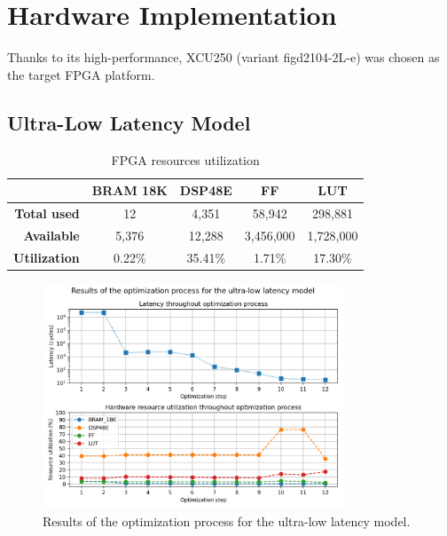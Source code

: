 \section{Hardware Implementation}
Thanks to its high-performance, XCU250 (variant figd2104-2L-e) was chosen as the target FPGA platform.

\subsection{Ultra-Low Latency Model}
\indo{|}
\indo{|}
\indo{|}

\indo{|}
\indo{|}

\begin{table}[hpt!]
  \centering
  \caption{FPGA resources utilization}
  \label{tab:utilization}
  \bgroup
  \def\arraystretch{1.3}
  \setlength\tabcolsep{3mm}
  \begin{tabular}{r|c|c|c|c|}
  \cline{2-5}
  \multicolumn{1}{c|}{}                      & \textbf{BRAM 18K} & \textbf{DSP48E} & \textbf{FF} & \textbf{LUT} \\ \hline
  \multicolumn{1}{|r|}{\textbf{Total used}}       & 12                 & 4,351            & 58,942       & 298,881       \\ \hline
  \multicolumn{1}{|r|}{\textbf{Available}}   & 5,376              & 12,288           & 3,456,000     & 1,728,000      \\ \hline\hline
  \multicolumn{1}{|r|}{\textbf{Utilization}} & 0.22\%            & 35.41\%         & 1.71\%      & 17.30\%       \\ \hline
  \end{tabular}
  \egroup
\end{table}

\indo{|}
\indo{|}
\indo{|}

\begin{figure}[hpt!]
  \centering
  \includegraphics[trim={0cm 0cm 0cm 1cm}, clip, width=0.8\textwidth, center]{../logs/hardware_optimizations.png}
  \caption{Results of the optimization process for the ultra-low latency model.}
  \label{fig:hardware-optimizations}
\end{figure}

